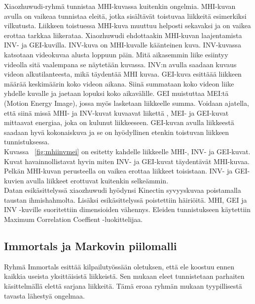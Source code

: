 Xiaozhuwudi-ryhmä tunnistaa MHI-kuvassa kuitenkin ongelmia. MHI-kuvan avulla on vaikeaa tunnistaa eleitä, jotka sisältävät toistuvaa liikkeitä esimerkiksi vilkutusta.
Liikkeen toistuessa MHI-kuva muuttuu helposti sekavaksi ja on vaikea erottaa tarkkaa liikerataa. Xiaozhuwudi ehdottaakin MHI-kuvan laajentamista INV- ja GEI-kuvilla.
INV-kuva on MHI-kuvalle käänteinen kuva. INV-kuvassa katsotaan videokuvaa alusta loppuun päin.
Mitä aikasemmin liike esiintyy videolla sitä vaalempana se näytetään kuvassa. INV:n avulla saadaan kuvaus videon alkutilanteesta, mikä täydentää MHI kuvaa. 
GEI-kuva esittäää liikkeen määrää keskimäärin koko videon aikana. Siinä summataan koko videon liike yhdelle kuvalle ja jaetaan lopuksi koko aikavälille.
GEI muistuttaa MEI:tä (Motion Energy Image), jossa myös lasketaan liikkeelle summa. Voidaan ajatella, että siinä missä MHI- ja INV-kuvat kuvaavat liikettä ,
MEI- ja GEI-kuvat mittaavat energiaa, joka on kulunut liikkeeseen. GEI-kuvan avulla liikkeestä saadaan hyvä kokonaiskuva ja se on hyödyllinen etenkin toistuvan
liikkeen tunnistuksessa. \citep {6239179} \\

Kuvassa ~\ref{fig:mhiinvmei} on esitetty kahdelle
liikkeelle MHI-, INV- ja GEI-kuvat. Kuvat havainnollistavat hyvin miten INV- ja GEI-kuvat
täydentävät MHI-kuvaa. Pelkän MHI-kuvan perusteella on vaikea erottaa liikkeet toisistaan.
INV- ja GEI-kuvien avulla liikkeet erottuvat kuitenkin selkeämmin. \\

Datan esikäsittelyssä xiaozhuwudi hyödynsi Kinectin syvyyskuvaa poistamalla taustan ihmishahmolta. Lisäksi esikäsittelyssä poistettiin häiriöitä.
MHI, GEI ja INV -kuville suoritettiin dimensioiden vähennys. Eleiden tunnistukseen käytettiin Maximum Correlation Coeffient -luokittelijaa. \citep {6239179}\\



\subsection{Immortals ja Markovin piilomalli}

Ryhmä Immortals esittää kilpailutyössään oletuksen, että ele koostuu ennen kaikkia useista yksittäisistä liikkeistä. 
Sen mukaan eleet tunnistetaan parhaiten käsittelmällä elettä sarjana liikkeitä. Tämä eroaa ryhmän mukaan tyypillisestä 
tavasta lähestyä ongelmaa.\\

